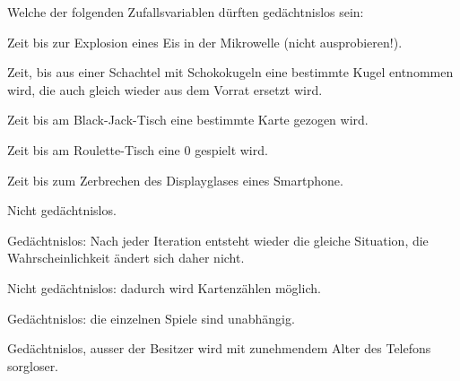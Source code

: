 Welche der folgenden Zufallsvariablen dürften gedächtnislos sein:
\begin{teilaufgaben}
\item Zeit bis zur Explosion eines Eis in der Mikrowelle (nicht ausprobieren!).
\item Zeit, bis aus einer Schachtel mit Schokokugeln eine bestimmte Kugel
entnommen wird, die auch gleich wieder aus dem Vorrat ersetzt wird.
\item Zeit bis am Black-Jack-Tisch eine bestimmte Karte gezogen wird.
\item Zeit bis am Roulette-Tisch eine 0 gespielt wird.
\item Zeit bis zum Zerbrechen des Displayglases eines Smartphone.
\end{teilaufgaben}

\begin{loesung}
\begin{teilaufgaben}
\item Nicht gedächtnislos.
\item Gedächtnislos: Nach jeder Iteration entsteht wieder die gleiche
Situation, die Wahrscheinlichkeit ändert sich daher nicht.
\item Nicht gedächtnislos: dadurch wird Kartenzählen möglich.
\item Gedächtnislos: die einzelnen Spiele sind unabhängig.
\item Gedächtnislos, ausser der Besitzer wird mit zunehmendem Alter des
Telefons sorgloser.
\end{teilaufgaben}
\end{loesung}
